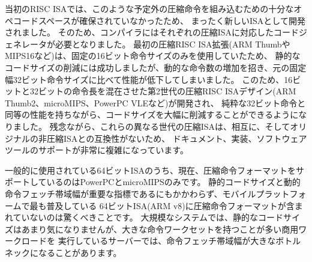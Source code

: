 \begin{commentary}
当初のRISC ISAでは、このような予定外の圧縮命令を組み込むための十分なオペコードスペースが確保されていなかったため、
まったく新しいISAとして開発されました。
そのため、コンパイラにはそれぞれの圧縮ISAに対応したコードジェネレータが必要となりました。
最初の圧縮RISC ISA拡張(ARM ThumbやMIPS16など)は、固定の16ビット命令サイズのみを使用していたため、
静的なコードサイズの削減には成功しましたが、動的な命令数の増加を招き、元の固定幅32ビット命令サイズに比べて性能が低下してしまいました。
このため、16ビットと32ビットの命令長を混在させた第2世代の圧縮RISC ISAデザイン(ARM Thumb2、microMIPS、PowerPC VLEなど)が開発され、
純粋な32ビット命令と同等の性能を持ちながら、コードサイズを大幅に削減することができるようになりました。
残念ながら、これらの異なる世代の圧縮ISAは、相互に、そしてオリジナルの非圧縮ISAとの互換性がないため、
ドキュメント、実装、ソフトウェアツールのサポートが非常に複雑になっています。

\begin{comment}
Of the commonly used 64-bit ISAs, only PowerPC and microMIPS currently
supports a compressed instruction format.  It is surprising that the
most popular 64-bit ISA for mobile platforms (ARM v8) does not include
a compressed instruction format given that static code size and
dynamic instruction fetch bandwidth are important metrics.  Although
static code size is not a major concern in larger systems, instruction
fetch bandwidth can be a major bottleneck in servers running
commercial workloads, which often have a large instruction working
set.
\end{comment}

一般的に使用されている64ビットISAのうち、現在、圧縮命令フォーマットをサポートしているのはPowerPCとmicroMIPSのみです。
静的コードサイズと動的命令フェッチ帯域幅が重要な指標であるにもかかわらず、モバイルプラットフォームで最も普及している
64ビットISA(ARM v8)に圧縮命令フォーマットが含まれていないのは驚くべきことです。
大規模なシステムでは、静的なコードサイズはあまり気になりませんが、大きな命令ワークセットを持つことが多い商用ワークロードを
実行しているサーバーでは、命令フェッチ帯域幅が大きなボトルネックになることがあります。

\begin{comment}
Benefiting from 25 years of hindsight, RISC-V was designed to support
compressed instructions from the outset, leaving enough opcode
space for RVC to be added as a simple extension on top of the base ISA
(along with many other extensions).  The philosophy of RVC is to
reduce code size for embedded applications \emph{and} to improve
performance and energy-efficiency for all applications due to fewer
misses in the instruction cache. Waterman shows that RVC fetches
25\%-30\% fewer instruction bits, which reduces instruction cache
misses by 20\%-25\%, or roughly the same performance impact as
doubling the instruction cache size~\cite{waterman-ms}.
\end{comment}


\end{commentary}
